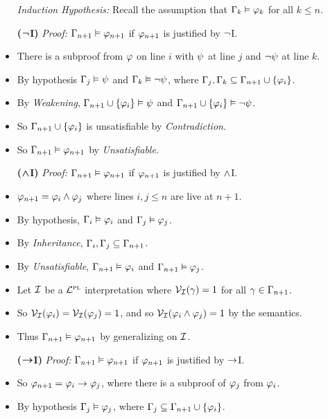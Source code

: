 \documentclass[a4paper, 11pt]{article} %
\begin{document}
\begin{itemize}
  \item[\it Induction Hypothesis:] Recall the assumption that $\Gamma_k \vDash \varphi_k$ for all $k \leq n$.
  \item[\bf ($\boldsymbol{\neg}$I)] \textit{Proof:} $\Gamma_{n+1} \vDash \varphi_{n+1}$ if $\varphi_{n+1}$ is justified by $\neg$I.
    \item There is a subproof from $\varphi$ on line $i$ with $\psi$ at line $j$ and $\neg\psi$ at line $k$. 
    \item By hypothesis $\Gamma_j\vDash \psi$ and $\Gamma_k\vDash\neg\psi$, where $\Gamma_j,\Gamma_k\subseteq\Gamma_{n+1}\cup\lbrace\varphi_i\rbrace$.
    \item By \textit{Weakening}, $\Gamma_{n+1}\cup\lbrace\varphi_i\rbrace\vDash\psi$ and $\Gamma_{n+1}\cup\lbrace\varphi_i\rbrace\vDash\neg\psi$.
    \item So $\Gamma_{n+1}\cup\lbrace\varphi_i\rbrace$ is unsatisfiable by \textit{Contradiction}.
    \item So $\Gamma_{n+1}\vDash\varphi_{n+1}$ by \textit{Unsatisfiable}.
  \item[\bf ($\boldsymbol{\wedge}$I)] \textit{Proof:} $\Gamma_{n+1} \vDash \varphi_{n+1}$ if $\varphi_{n+1}$ is justified by $\wedge$I.
    \item $\varphi_{n+1} = \varphi_i\wedge\varphi_j$ where lines $i,j\leq n$ are live at $n+1$.
    \item By hypothesis, $\Gamma_i\vDash\varphi_i$ and $\Gamma_j\vDash\varphi_j$.
    \item By \textit{Inheritance}, $\Gamma_i, \Gamma_j \subseteq \Gamma_{n+1}$.
    \item By \textit{Unsatisfiable}, $\Gamma_{n+1} \vDash \varphi_i$ and $\Gamma_{n+1} \vDash \varphi_j$.
    \item Let $\mathcal{I}$ be a $\mathcal{L}^{\textsc{pl}}$ interpretation where $\mathcal{V}_{\mathcal{I}}(\gamma) = 1$ for all $\gamma \in \Gamma_{n+1}$. 
    \item So $\mathcal{V}_{\mathcal{I}}(\varphi_i) = \mathcal{V}_{\mathcal{I}}(\varphi_j) = 1$, and so $\mathcal{V}_{\mathcal{I}}(\varphi_i \wedge \varphi_j) = 1$ by the semantics.
    \item Thus $\Gamma_{n+1}\vDash\varphi_{n+1}$ by generalizing on $\mathcal{I}$.
  \item[\bf ($\boldsymbol{\rightarrow}$I)] \textit{Proof:} $\Gamma_{n+1} \vDash \varphi_{n+1}$ if $\varphi_{n+1}$ is justified by $\rightarrow$I.
    \item So $\varphi_{n+1} = \varphi_i \rightarrow \varphi_j$, where there is a subproof of $\varphi_j$ from $\varphi_i$. 
    \item By hypothesis $\Gamma_j\vDash \varphi_j$, where $\Gamma_j\subseteq\Gamma_{n+1}\cup\lbrace\varphi_i\rbrace$.

\end{itemize}
\end{document}
